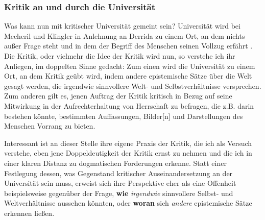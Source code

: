 \subsubsection{Kritik an und durch die Universität}

Was kann nun mit kritischer Universität gemeint sein? Universität wird bei
Mecheril und Klingler in Anlehnung an Derrida \footnotemark
{} zu einem Ort, an dem nichts
außer Frage steht und in dem der \glqq Begriff des Menschen seinen Vollzug
erfährt \grqq\footnotemark {}. Die Kritik, oder vielmehr die Idee der Kritik wird nun, so verstehe
ich ihr Anliegen, im doppelten Sinne gedacht: Zum einen wird die Universität zu
einem Ort, an dem Kritik geübt wird, indem \glqq andere epistemische Sätze\grqq \footnotemark {} über
die Welt gesagt werden, die \glqq irgendwie sinnvollere Welt- und
Selbstverhältnisse\grqq\footnotemark {} versprechen. Zum anderen gilt es, jenen Auftrag der Kritik
kritisch in Bezug auf seine Mitwirkung in der Aufrechterhaltung von Herrschaft
zu befragen, die z.B. darin bestehen könnte, bestimmten \glqq Auffassungen,
Bilder[n] und Darstellungen des Menschen\grqq\footnotemark
{} Vorrang zu bieten.

Interessant ist an dieser Stelle ihre eigene Praxis der Kritik, die ich als Versuch verstehe,
eben jene Doppeldeutigkeit der Kritik ernst zu nehmen und die ich in einer
klaren Distanz zu dogmatischen Forderungen erkenne. Statt einer Festlegung
dessen, was Gegenstand kritischer Auseinandersetzung an der Universität sein
muss, erweist sich ihre Perspektive eher als eine Offenheit beispielsweise
gegenüber der Frage, \textbf{wie} \textit{irgendwie} sinnvollere Selbst- und Weltverhältnisse
aussehen könnten, oder \textbf{woran} sich \textit{andere} epistemische Sätze erkennen ließen. 

